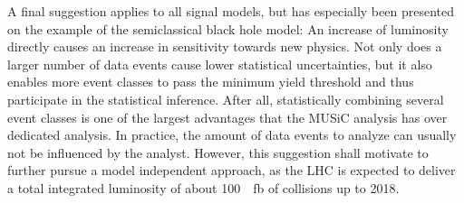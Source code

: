 A final suggestion applies to all signal models, but has especially been presented on the example of the semiclassical black hole model: An increase of luminosity directly causes an increase in sensitivity towards new physics. Not only does a larger number of data events cause lower statistical uncertainties, but it also enables more event classes to pass the minimum yield threshold and thus participate in the statistical inference. After all, statistically combining several event classes is one of the largest advantages that the \ac{MUSiC} analysis has over dedicated analysis.
In practice, the amount of data events to analyze can usually not be influenced by the analyst. However, this suggestion shall motivate to further pursue a model independent approach, as the \ac{LHC} is expected to deliver a total integrated luminosity of about \SI{100}{\per\femto\barn} of collisions up to 2018\cite{Lamont:LHCCommissioningLonger}.


